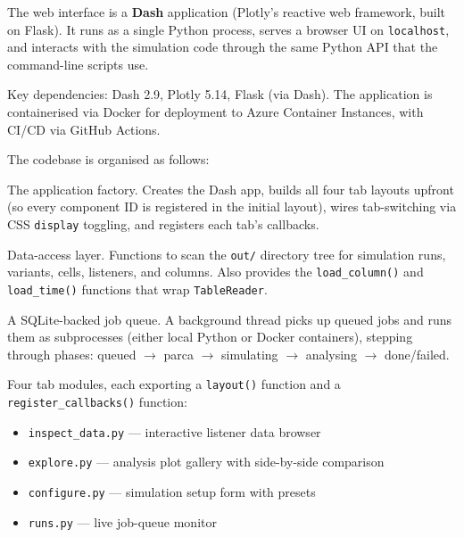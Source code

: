 \documentclass[11pt,a4paper]{article}
\begin{document}
The web interface is a \textbf{Dash} application (Plotly's reactive web
framework, built on Flask).  It runs as a single Python process, serves a
browser UI on \texttt{localhost}, and interacts with the simulation code
through the same Python API that the command-line scripts use.

Key dependencies: Dash 2.9, Plotly 5.14, Flask (via Dash).  The application
is containerised via Docker for deployment to Azure Container Instances, with
CI/CD via GitHub Actions.

The codebase is organised as follows:

\begin{description}[style=nextline, leftmargin=2cm]
  \item[\texttt{app.py}]
    The application factory.  Creates the Dash app, builds all four tab layouts
    upfront (so every component ID is registered in the initial layout), wires
    tab-switching via CSS \texttt{display} toggling, and registers each tab's
    callbacks.

  \item[\texttt{results.py}]
    Data-access layer.  Functions to scan the \texttt{out/} directory tree for
    simulation runs, variants, cells, listeners, and columns.  Also provides
    the \texttt{load\_column()} and \texttt{load\_time()} functions that wrap
    \texttt{TableReader}.

  \item[\texttt{jobs.py}]
    A SQLite-backed job queue.  A background thread picks up queued jobs and
    runs them as subprocesses (either local Python or Docker containers),
    stepping through phases: queued $\to$ parca $\to$ simulating $\to$
    analysing $\to$ done/failed.

  \item[\texttt{tabs/}]
    Four tab modules, each exporting a \texttt{layout()} function and a
    \texttt{register\_callbacks()} function:
    \begin{itemize}[nosep]
      \item \texttt{inspect\_data.py} --- interactive listener data browser
      \item \texttt{explore.py} --- analysis plot gallery with side-by-side
            comparison
      \item \texttt{configure.py} --- simulation setup form with presets
      \item \texttt{runs.py} --- live job-queue monitor
    \end{itemize}
\end{description}
\end{document}
